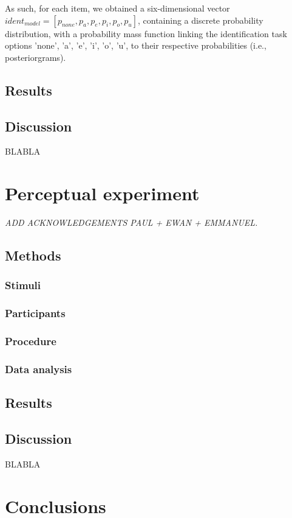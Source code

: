 As such, for each item, we obtained a six-dimensional vector $ident_{model} = [p_{none}, p_{a}, p_{e}, p_{i}, p_{o}, p_{u}]$, containing a discrete probability distribution, with a probability mass function linking the identification task options 'none', 'a', 'e', 'i', 'o', 'u', to their respective probabilities (i.e., posteriorgrams).
\subsection{Results}
\subsection{Discussion}

BLABLA


\section{Perceptual experiment}
\small{\textit{{\color{red}ADD ACKNOWLEDGEMENTS PAUL + EWAN + EMMANUEL.\\}}}
\subsection{Methods}
\subsubsection{Stimuli}
\subsubsection{Participants}
\subsubsection{Procedure}
\subsubsection{Data analysis}
\subsection{Results}
\subsection{Discussion}

BLABLA
\section{Conclusions}



